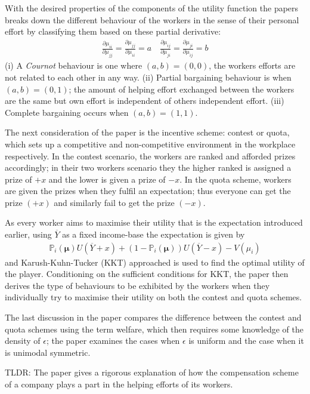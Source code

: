\documentclass[a4paper,10pt,leqno]{article}
\theoremstyle{definition}
\begin{document}
With the desired properties of the components of the utility function the papers breaks down the different behaviour of the workers in the sense of their personal effort by classifying them based on these partial derivative:
\begin{align*}
\frac{\partial\mu_{ii}}{\partial\mu_{jj}}=\frac{\partial\mu_{jj}}{\partial\mu_{ii}}=a\quad
\frac{\partial\mu_{ij}}{\partial\mu_{ji}}=\frac{\partial\mu_{ji}}{\partial\mu_{ij}}=b
\end{align*}
(i) A \emph{Cournot} behaviour is one where $(a,b)=(0,0)$, the workers efforts are not related to each other in any way. (ii) Partial bargaining behaviour is when $(a,b)=(0,1)$; the amount of helping effort exchanged between the workers are the same but own effort is independent of others independent effort. (iii) Complete bargaining occurs when $(a,b)=(1,1)$.


The next consideration of the paper is the incentive scheme: contest or quota, which sets up a competitive and non-competitive environment in the workplace respectively. In the contest scenario, the workers are ranked and afforded prizes accordingly; in their two workers scenario they the higher ranked is assigned a prize of $+x$ and the lower is given a prize of $-x$. In the quota scheme, workers are given the prizes when they fulfil an expectation; thus everyone can get the prize $(+x)$ and similarly fail to get the prize $(-x)$.

As every worker aims to maximise their utility that is the expectation introduced earlier, using $\overline{Y}$ as a fixed income-base the expectation is given by
\begin{align*}
\mathbb{P}_i(\mathbf{\mu})U(\overline{Y}+x)+(1-\mathbb{P}_i(\mathbf{\mu}))U(\overline{Y}-x)-V(\mu_i)
\end{align*}
and Karush-Kuhn-Tucker (KKT) approached is used to find the optimal utility of the player. Conditioning on the sufficient conditions for KKT, the paper then derives the type of behaviours to be exhibited by the workers when they individually try to maximise their utility on both the contest and quota schemes.

The last discussion in the paper compares the difference between the contest and quota schemes using the term welfare, which then requires some knowledge of the density of $\epsilon$; the paper examines the cases when $\epsilon$ is uniform and the case when it is unimodal symmetric.

TLDR: The paper gives a rigorous explanation of how the compensation scheme of a company plays a part in the helping efforts of its workers. 
 
\end{document}
